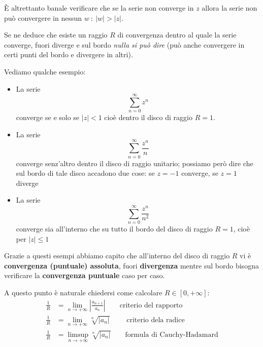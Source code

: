 È altrettanto banale verificare che se la serie non converge in $z$ allora la serie non può convergere in nessun $w\ :\ |w|>|z|$. 

Se ne deduce che esiste un raggio $R$ di convergenza dentro al quale la serie converge, fuori diverge e sul bordo \textit{nulla si può dire} (può anche convergere in certi punti del bordo e divergere in altri).

Vediamo qualche esempio:

\begin{itemize}
\item La serie
\begin{equation*}
\sum\limits^{\infty}_{n = 0} z^{n}
\end{equation*}
converge se e solo se $|z| < 1$ cioè dentro il disco di raggio $R=1$.

\item La serie
\begin{equation*}
\sum\limits^{\infty}_{n = 0}\frac{z^{n}}{n}
\end{equation*}
converge senz'altro dentro il disco di raggio unitario; possiamo però dire che sul bordo di tale disco accadono due cose: se $z=-1$ converge, se $z=1$ diverge

\item La serie
\begin{equation*}
\sum\limits^{\infty}_{n = 0}\frac{z^{n}}{n^{2}}
\end{equation*}
converge sia all'interno che su tutto il bordo del disco di raggio $R=1$, cioè per $| z| \leq 1$
\end{itemize}

\begin{rem}
Grazie a questi esempi abbiamo capito che all'interno del disco di raggio $R$ vi è \textbf{convergenza (puntuale) assoluta}, fuori \textbf{divergenza} mentre sul bordo bisogna verificare la \textbf{convergenza puntuale} caso per caso.
\end{rem}

A questo punto è naturale chiedersi come calcolare $R\in[0,+\infty]$:
\begin{align*}
\frac{1}{R}&=\lim_{n\to+\infty}\left|\frac{a_{n+1}}{a_n}\right| \qquad\text{criterio del rapporto} \\
\frac{1}{R}&=\lim_{n\to+\infty}\sqrt[n]{|a_n|}\qquad\text{ criterio dela radice} \\
\frac{1}{R}&=\limsup_{n\to+\infty}\sqrt[n]{|a_n|}\qquad\text{formula di Cauchy-Hadamard}
\end{align*}

